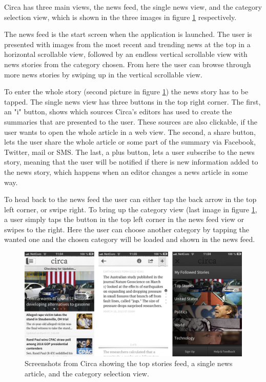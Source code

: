 Circa has three main views, the news feed, the single news view, and the category selection view, which is shown in the three images in figure \ref{screenshots_circa} respectively.

The news feed is the start screen when the application is launched. The user is presented with images from the most recent and trending news at the top in a horizontal scrollable view, followed by an endless vertical scrollable view with news stories from the category chosen. From here the user can browse through more news stories by swiping up in the vertical scrollable view.

To enter the whole story (second picture in figure \ref{screenshots_circa}) the news story has to be tapped. The single news view has three buttons in the top right corner. The first, an "i" button, shows which sources Circa's editors has used to create the summaries that are presented to the user. These sources are also clickable, if the user wants to open the whole article in a web view. The second, a share button, lets the user share the whole article or some part of the summary via Facebook, Twitter, mail or SMS. The last, a plus button, lets a user subscribe to the news story, meaning that the user will be notified if there is new information added to the news story, which happens when an editor changes a news article in some way.

To head back to the news feed the user can either tap the back arrow in the top left corner, or swipe right. To bring up the category view (last image in figure \ref{screenshots_circa}, a user simply taps the button in the top left corner in the news feed view or swipes to the right. Here the user can choose another category by tapping the wanted one and the chosen category will be loaded and shown in the news feed.

\begin{figure}[!htbp]
\centering
\includegraphics[width=130mm]{GFX/screenshots/circa.png}
\caption{Screenshots from Circa showing the top stories feed, a single news article, and the category selection view.}
\label{screenshots_circa}
\end{figure}


